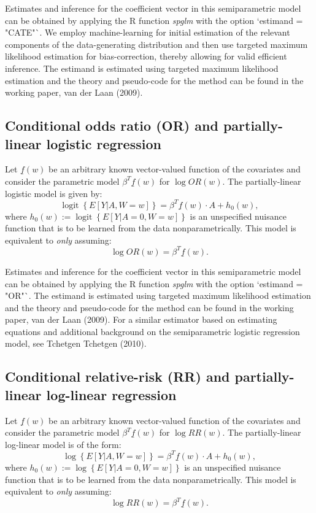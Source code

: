 \documentclass{article}
\DeclareMathOperator{\logit}{logit}
\begin{document}
Estimates and inference for the coefficient vector in this semiparametric model can be obtained by applying the R function \textit{spglm} with the option `estimand = "CATE"`. We employ machine-learning for initial estimation of the relevant components of the data-generating distribution and then use targeted maximum likelihood estimation for bias-correction, thereby allowing for valid efficient inference. The estimand is estimated using targeted maximum likelihood estimation and the theory and pseudo-code for the method can be found in the working paper, van der Laan (2009). \nocite{OddsRatioreadingsTMLE}

\subsection{Conditional odds ratio (OR) and partially-linear logistic regression}
Let $\underline{f}(w)$ be an arbitrary known vector-valued function of the covariates and consider the parametric model $\beta^T \underline{f}(w)$ for $\log OR(w)$. The partially-linear logistic model is given by:
$$\logit\left\{E[Y|A,W=w]\right\} = \beta^T \underline{f}(w) \cdot A + h_0(w),$$
where $ h_0(w) := \logit\left\{E[Y|A=0,W=w]\right\}$ is an unspecified nuisance function that is to be learned from the data nonparametrically. This model is equivalent to \textit{only} assuming:
$$\log OR(w) = \beta^T \underline{f}(w).$$

Estimates and inference for the coefficient vector in this semiparametric model can be obtained by applying the R function \textit{spglm} with the option `estimand = "OR"`. The estimand is estimated using targeted maximum likelihood estimation and the theory and pseudo-code for the method can be found in the working paper, van der Laan (2009). \nocite{OddsRatioreadingsTMLE}
For a similar estimator based on estimating equations and additional background on the semiparametric logistic regression model, see Tchetgen Tchetgen (2010). \nocite{TchetgenOddsRatio}



\subsection{Conditional relative-risk (RR) and partially-linear log-linear regression}
Let $\underline{f}(w)$ be an arbitrary known vector-valued function of the covariates and consider the parametric model $\beta^T \underline{f}(w)$ for $\log RR(w)$. The partially-linear log-linear model is of the form:
$$\log\left\{E[Y|A,W=w]\right\} = \beta^T \underline{f}(w) \cdot A + h_0(w),$$
where $ h_0(w) := \log\left\{E[Y|A=0,W=w]\right\}$ is an unspecified nuisance function that is to be learned from the data nonparametrically. This model is equivalent to \textit{only} assuming:
$$\log RR(w) =\beta^T \underline{f}(w).$$
\end{document}
